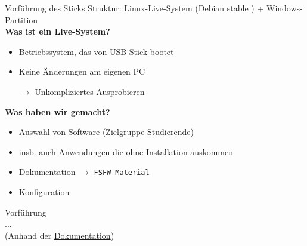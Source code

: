 \documentclass[t]{beamer}
\begin{document}
\begin{frame}[label=vf1]{\color{fg}Vorführung des Sticks}
Struktur: Linux-Live-System (Debian stable ) + Windows-Partition\\[3mm]

\textbf{Was ist ein Live-System?}
\begin{itemize}
  \item Betriebssystem, das von USB-Stick bootet
  \item[]
  \item Keine Änderungen am eigenen PC
  \item[$\rightarrow$] Unkompliziertes Ausprobieren
  \item[]
  \end{itemize}

\pause
\textbf{Was haben wir gemacht?}
  \begin{itemize}
  \item Auswahl von Software (Zielgruppe Studierende)
  \item insb. auch Anwendungen die ohne Installation auskommen
  \item Dokumentation $\rightarrow$ \texttt{FSFW-Material}
  \item Konfiguration
  \end{itemize}

\end{frame}




\begin{frame}[label=ct4]{\color{fg}{}}
 \vspace{20mm}

\begin{center}
Vorführung\\ ... \\[10mm]

{\tiny (Anhand der \href{https://github.com/fsfw-dresden/usb-live-linux/blob/master/doc/src/index.md}{Dokumentation})}



\end{center}
\end{frame}

\end{document}
